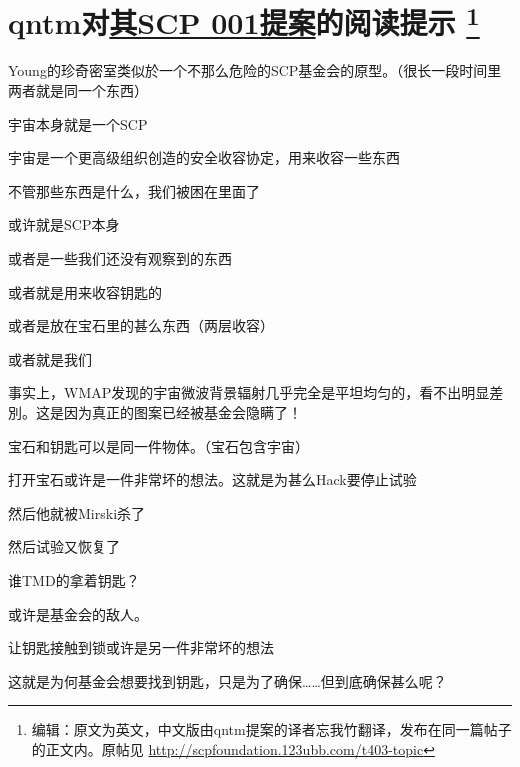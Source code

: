 \chapter[qntm对其SCP 001提案的阅读提示]{
qntm对\hyperref[chap:SCP.001.the.lock]{其SCP 001提案}的阅读提示
	\protect\footnote{
		编辑\QIS ：原文为英文，中文版由qntm提案的译者忘我竹翻译，发布在同一篇帖子的正文内。原帖见 \url{http://scpfoundation.123ubb.com/t403-topic}
	}
}

\label{chap:qntm.tips}

Young的珍奇密室类似於一个不那么危险的SCP基金会的原型。（很长一段时间里两者就是同一个东西）

宇宙本身就是一个SCP

宇宙是一个更高级组织创造的安全收容协定，用来收容一些东西

不管那些东西是什么，我们被困在里面了

或许就是SCP本身

或者是一些我们还没有观察到的东西

或者就是用来收容钥匙的

或者是放在宝石里的甚么东西（两层收容）

或者就是我们

事实上，WMAP发现的宇宙微波背景辐射几乎完全是平坦均匀的，看不出明显差別。这是因为真正的图案已经被基金会隐瞒了！

宝石和钥匙可以是同一件物体。（宝石包含宇宙）

打开宝石或许是一件非常坏的想法。这就是为甚么Hack要停止试验

然后他就被Mirski杀了

然后试验又恢复了

谁TMD的拿着钥匙？

或许是基金会的敌人。

让钥匙接触到锁或许是另一件非常坏的想法

这就是为何基金会想要找到钥匙，只是为了确保……但到底确保甚么呢？
